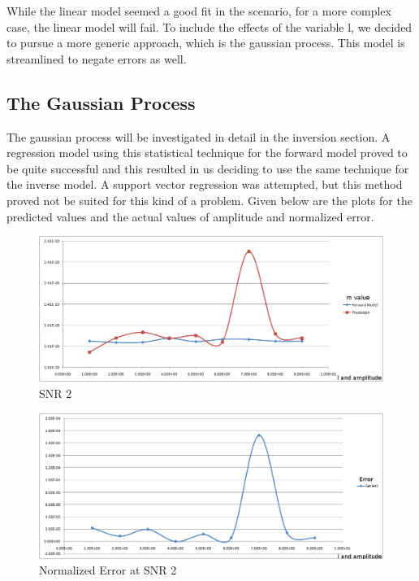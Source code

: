 While the linear model seemed a good fit in the scenario, for a more complex case, the linear model will fail. To include the effects of the variable l, we decided to pursue a more generic approach, which is the gaussian process. This model is streamlined to negate errors as well.
\subsection{The Gaussian Process}

The gaussian process will be investigated in detail in the inversion section. A regression model using this statistical technique for the forward model proved to be quite successful and this resulted in us deciding to use the same technique for the inverse model. A support vector regression was attempted, but this method proved not be suited for this kind of a problem. Given below are the plots for the predicted values and the actual values of amplitude and normalized error.

\begin{figure}
\begin{center}
\includegraphics[scale=0.5]{images/chapter_5/forward/forward_snr_2.png}
\caption{SNR 2}
\end{center}
\end{figure}


\begin{figure}
\begin{center}
\includegraphics[scale=0.5]{images/chapter_5/forward/error_snr_2.png}
\caption{Normalized Error at SNR 2}
\end{center}
\end{figure}


